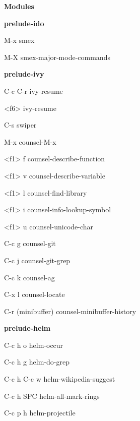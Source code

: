 \documentclass[10pt]{article}
\renewcommand\section[1]{\bigskip\par\textbf{\color{heading}\large#1}\smallskip}
\renewcommand\subsection[1]{\smallskip\par\textbf{\color{heading}#1}}
\renewcommand\section[1]{\bigskip\par\textbf{\color{heading}\large#1}\smallskip}
\renewcommand\subsection[1]{\smallskip\par\textbf{\color{heading}#1}}
\begin{document}
\begin{multicols}{4}
  \section{Modules}
  \subsection{prelude-ido}
  \begin{keylist}
  \item[M-x] smex
  \item[M-X] smex-major-mode-commands
  \end{keylist}

  \subsection{prelude-ivy}
  \begin{keylist}
  \item[C-c C-r] ivy-resume
  \item[<f6>] ivy-resume
  \item[C-s] swiper
  \item[M-x] counsel-M-x
  \item[<f1> f] counsel-describe-function
  \item[<f1> v] counsel-describe-variable
  \item[<f1> l] counsel-find-library
  \item[<f1> i] counsel-info-lookup-symbol
  \item[<f1> u] counsel-unicode-char
  \item[C-c g] counsel-git
  \item[C-c j] counsel-git-grep
  \item[C-c k] counsel-ag
  \item[C-x l] counsel-locate
  \item[C-r] (minibuffer) counsel-minibuffer-history
  \end{keylist}

  \subsection{prelude-helm}
  \begin{keylist}
  \item[C-c h o] helm-occur
  \item[C-c h g] helm-do-grep
  \item[C-c h C-c w] helm-wikipedia-suggest
  \item[C-c h SPC] helm-all-mark-rings
  \item[C-c p h] helm-projectile
  \end{keylist}


\end{multicols}
\end{document}
